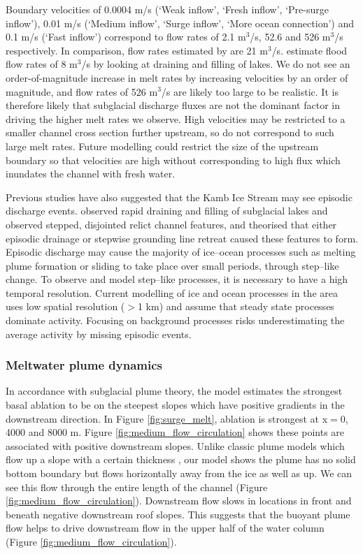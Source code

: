 Boundary velocities of 0.0004  $\mathrm{m}$/s (`Weak inflow', `Fresh inflow', `Pre-surge inflow'), 0.01  $\mathrm{m}$/s (`Medium inflow', `Surge inflow', `More ocean connection') and 0.1 $\mathrm{m}$/s (`Fast inflow') correspond to flow rates of 2.1 $\mathrm{m}^3$/s, 52.6 and 526 $\mathrm{m}^3$/s respectively. In comparison, flow rates estimated by \cite{le2009subglacial} are 21 $\mathrm{m}^3$/s. \cite{kim2016active} estimate flood flow rates of 8 $\mathrm{m}^3$/s by looking at draining and filling of lakes. We do not see an order-of-magnitude increase in melt rates by increasing velocities by an order of magnitude, and flow rates of 526 $\mathrm{m}^3$/s are likely too large to be realistic. It is therefore likely that subglacial discharge fluxes are not the dominant factor in driving the higher melt rates we observe. High velocities may be restricted to a smaller channel cross section further upstream, so do not correspond to such large melt rates. Future modelling could restrict the size of the upstream boundary so that velocities are high without corresponding to high flux which inundates the channel with fresh water.

Previous studies have also suggested that the Kamb Ice Stream may see episodic discharge events. \cite{kim2016active} observed rapid draining and filling of subglacial lakes and \cite{horgan2017poststagnation} observed stepped, disjointed relict channel features, and theorised that either episodic drainage or stepwise grounding line retreat caused these features to form.
Episodic discharge may cause the majority of ice--ocean processes such as melting plume formation or sliding to take place over small periods, through step--like change. To observe and model step--like processes, it is necessary to have a high temporal resolution. Current modelling of ice and ocean processes in the area \citep[e.g.][]{holland2003ice} uses low spatial resolution ($>$1 km) and assume that steady state processes dominate activity. Focusing on background processes risks underestimating the average activity by missing episodic events.

\subsubsection{Meltwater plume dynamics} 
In accordance with subglacial plume theory, the model estimates the strongest basal ablation to be on the steepest slopes which have  positive gradients in the downstream direction. In Figure \ref{fig:surge_melt}, ablation is strongest at x$=$0, 4000 and 8000 m. Figure \ref{fig:medium_flow_circulation} shows these points are associated with positive downstream slopes. 
Unlike classic plume models which flow up a slope with a certain thickness \citep[e.g.][]{hewitt2020subglacial}, our model shows the plume has no solid bottom boundary but flows horizontally away from the ice as well as up. We can see this flow through the entire length of the channel (Figure \ref{fig:medium_flow_circulation}). Downstream flow slows in locations in front and beneath negative downstream roof slopes. This suggests that the buoyant plume flow helps to drive downstream flow in the upper half of the water column (Figure \ref{fig:medium_flow_circulation}).

